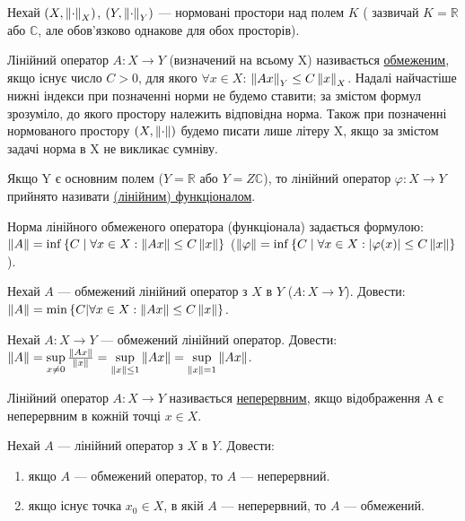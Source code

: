 
\begin{theory}
    Нехай $(X, \left\lVert\cdot\right\rVert_X)$, $(Y, \left\lVert\cdot\right\rVert_Y)$ --- нормовані простори над полем $K$ (
        зазвичай $K = 
    \mathbb{R}$ або $\mathbb{C}$, 
    але обов'язково однакове для обох просторів). 

    Лінійний оператор $A: X \rightarrow Y$ (визначений на всьому X) називається 
    \underline{обмеженим}, якщо існує число $C > 0$, для якого $\forall x \in X$: 
    $\left\lVert Ax\right\rVert_Y \leq C \left\lVert x\right\rVert_X$. Надалі найчастіше нижні індекси при позначенні норми 
    не будемо ставити; за змістом формул зрозуміло, до якого простору належить відповідна 
    норма. Також при позначенні нормованого простору $(X, \left\lVert\cdot\right\rVert)$ будемо писати лише 
    літеру X, якщо за змістом задачі норма в X не викликає сумніву. 

    Якщо Y є основним полем ($Y=\mathbb{R}$ або $Y =Z \mathbb{C}$), то лінійний оператор 
    $\varphi: X \rightarrow Y$ прийнято називати \underline{(лінійним) функціоналом}.

    Норма лінійного обмеженого оператора (функціонала) задається формулою: 
    $\left\lVert A\right\rVert = \inf\left\{C\;|\;\forall x \in X : \left\lVert Ax\right\rVert\leq C\left\lVert x\right\rVert \right\}$
    ($\left\lVert\varphi\right\rVert = \inf\left\{C \;|\; \forall x \in X : |\varphi(x)|\leq C\left\lVert x\right\rVert \right\}$).
\end{theory}

\begin{exercise}
    Нехай $A$ --- обмежений лінійний оператор з $X$ в $Y$ ($A: X \rightarrow Y$).
    Довести: $\left\lVert A\right\rVert = \min\left\{C|\forall x \in X : \left\lVert Ax\right\rVert \leq C\left\lVert x\right\rVert\right\}$.
\end{exercise}

\begin{exercise}
    Нехай $A: X \rightarrow Y$ --- обмежений лінійний оператор.
    Довести: $\left\lVert A\right\rVert = \sup\limits_{x \neq 0}\frac{\left\lVert Ax\right\rVert}{\left\lVert x\right\rVert} = 
    \sup\limits_{\left\lVert x\right\rVert \leq 1}\left\lVert Ax\right\rVert = \sup\limits_{\left\lVert x\right\rVert = 1}\left\lVert Ax\right\rVert$.
\end{exercise}

\begin{theory}
    Лінійний оператор $A: X \rightarrow Y$ називається \underline{неперервним}, якщо відображення 
    A є неперервним в кожній точці $x \in X$.
\end{theory}

\begin{exercise}
    Нехай $A$ --- лінійний оператор з $X$ в $Y$. Довести: 
    \begin{enumerate}[label=\alph*)]
        \item якщо $A$ --- обмежений оператор, то $A$ --- неперервний.
        \item якщо існує точка $x_0 \in X$, в якій $A$ --- неперервний, то $A$ --- обмежений.
    \end{enumerate}
\end{exercise}

